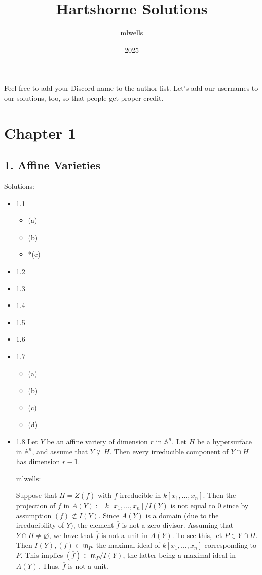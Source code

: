 \documentclass{article}
\title{Hartshorne Solutions}
\author{mlwells}
\date{2025}
\begin{document}
\maketitle
Feel free to add your Discord name to the author list.  Let's add our usernames to our solutions, too, so that people get proper credit.
\section*{Chapter 1}
\subsection*{1. Affine Varieties}
Solutions:
\begin{itemize}
    \item [] 1.1
    \begin{itemize}
        \item [] (a)
        \item [] (b)
        \item [] *(c)
    \end{itemize}
    \item [] 1.2
    \item [] 1.3
    \item [] 1.4
    \item [] 1.5
    \item [] 1.6
    \item [] 1.7
    \begin{itemize}
        \item [] (a)
        \item [] (b)
        \item [] (c)
        \item [] (d)
    \end{itemize}
    \item [] 1.8  Let $Y$ be an affine variety of dimension $r$ in $\mathbb{A}^n$.  Let $H$ be a hypersurface in $\mathbb{A}^n$, and assume that $Y \not\subseteq H$.  Then every irreducible component of $Y \cap H$ has dimension $r-1$.

    mlwells:
    
    Suppose that $H = Z(f)$ with $f$ irreducible in $k[x_1,\ldots, x_n]$.  Then the projection of $f$ in $A(Y) := k[x_1,\ldots,x_n]/I(Y)$ is not equal to $\overline{0}$ since by assumption $(f) \not\subset I(Y)$.  Since $A(Y)$ is a domain (due to the irreducibility of $Y$), the element $\overline{f}$ is not a zero divisor.  Assuming that $Y \cap H \neq \varnothing$, we have that $\overline{f}$ is not a unit in $A(Y)$.  To see this, let $P \in Y \cap H$.  Then $I(Y), (f) \subset \mathfrak{m}_P$, the maximal ideal of $k[x_1,\ldots,x_n]$ corresponding to $P$.  This implies $(\overline{f}) \subset \mathfrak{m}_P / I(Y)$, the latter being a maximal ideal in $A(Y)$.  Thus, $\overline{f}$ is not a unit.


\end{itemize}
\end{document}
